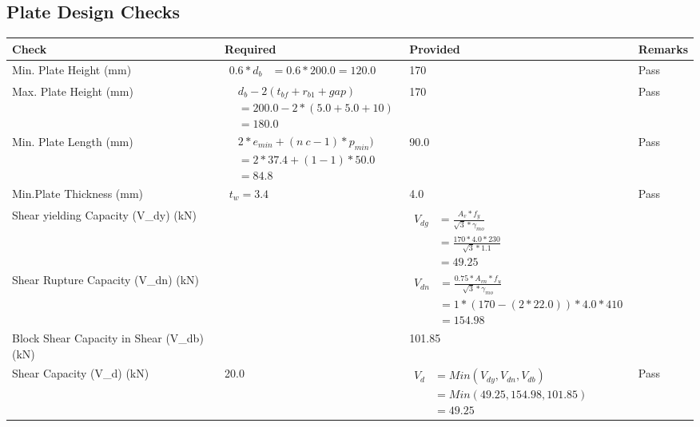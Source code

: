 \documentclass{article}%
\begin{document}
%
\subsection{Plate Design Checks}%
\label{subsec:PlateDesignChecks}%
\renewcommand{\arraystretch}{1.2}%
\begin{longtable}{|p{4cm}|p{5cm}|p{5.5cm}|p{1.5cm}|}%
\hline%
\rowcolor{OsdagGreen}%
Check&Required&Provided&Remarks\\%
\hline%
\endhead%
\hline%
Min. Plate Height (mm)&$\begin{aligned}0.6 * d_b&= 0.6 * 200.0=120.0\end{aligned}$&170&Pass\\%
\hline%
Max. Plate Height (mm)&$\begin{aligned} &d_b - 2 (t_{bf} + r_{b1} + gap)\\ &=200.0- 2* (5.0+5.0+ 10)\\ &=180.0\end{aligned}$&170&Pass\\%
\hline%
Min. Plate Length (mm)&$\begin{aligned} &2*e_{min} + (n~c-1) * p_{min})\\ &=2*37.4+(1-1) * 50.0\\ &=84.8\end{aligned}$&90.0&Pass\\%
\hline%
Min.Plate Thickness (mm)&$\begin{aligned} t_w=3.4\end{aligned}$&4.0&Pass\\%
\hline%
Shear yielding Capacity (V\_dy) (kN)&&$\begin{aligned} V_{dg} &= \frac{A_v*f_y}{\sqrt{3}*\gamma_{mo}}\\ &=\frac{170*4.0*230}{\sqrt{3}*1.1}\\ &=49.25\end{aligned}$&\\%
\hline%
Shear Rupture Capacity (V\_dn) (kN)&&$\begin{aligned} V_{dn} &= \frac{0.75*A_{vn}*f_u}{\sqrt{3}*\gamma_{mo}}\\ &=1*(170-(2*22.0))*4.0*410\\ &=154.98\end{aligned}$&\\%
\hline%
Block Shear Capacity in Shear (V\_db) (kN)&&101.85&\\%
\hline%
Shear Capacity (V\_d) (kN)&20.0&$\begin{aligned} V_d &= Min(V_{dy},V_{dn},V_{db})\\ &= Min(49.25,154.98,101.85)\\ &=49.25\end{aligned}$&Pass\\%

\end{longtable}
\end{document}
